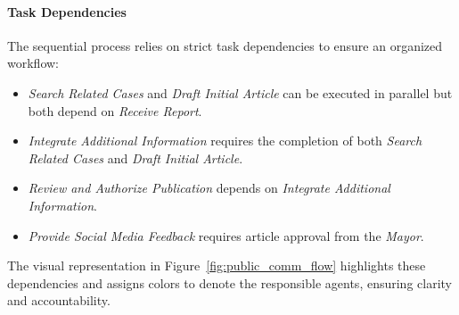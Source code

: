 \paragraph{Task Dependencies}
The sequential process relies on strict task dependencies to ensure an organized workflow:
\begin{itemize}
	\item \textit{Search Related Cases} and \textit{Draft Initial Article} can be executed in parallel but both depend on \textit{Receive Report}.
	\item \textit{Integrate Additional Information} requires the completion of both \textit{Search Related Cases} and \textit{Draft Initial Article}.
	\item \textit{Review and Authorize Publication} depends on \textit{Integrate Additional Information}.
	\item \textit{Provide Social Media Feedback} requires article approval from the \textit{Mayor}.
\end{itemize}

The visual representation in Figure~\ref{fig:public_comm_flow} highlights these dependencies and assigns colors to denote the responsible agents, ensuring clarity and accountability. 